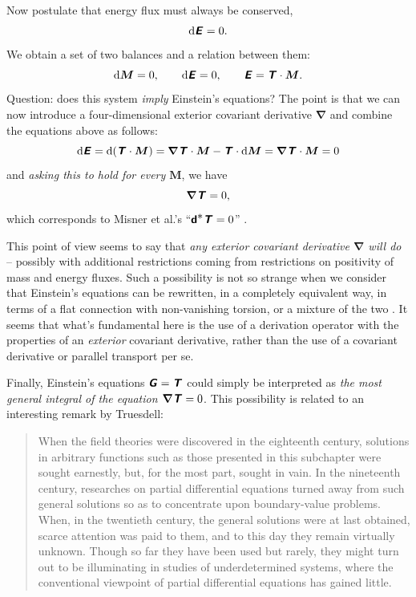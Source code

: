 \documentclass[\ifafour a4paper,12pt,\else a5paper,10pt,\fi%
onecolumn,oneside,article,%
british%
]{memoir}
\theoremstyle{remark}
\theoremstyle{innote}
\newcommand*{\mathte}[1]{\textbf{\textit{\textsf{#1}}}}
\newcommand*{\citep}{\parencites}
\newcommand*{\di}{\mathrm{d}}%
\renewcommand*{\|}{\nonscript\,\vert\nonscript\;\mathopen{}}
\newcommand*{\chap}{ch.}%
\newcommand*{\etal}{{et al.}}
\newcommand*{\yrr}{M}
\newcommand*{\yr}{\bm{\yrr}}
\newcommand*{\yEE}{E}
\newcommand*{\yE}{\mathte{\yEE}}
\newcommand*{\yEii}{G}
\newcommand*{\yEi}{\mathte{\yEii}}
\newcommand*{\yTTf}{T}
\newcommand*{\yTf}{\mathte{\yTTf}}
\newcommand*{\yDi}{\bm{\nabla}}
\begin{document}
Now postulate that energy flux must always be conserved,
\begin{equation}
  \label{eq:conserv_energy-momentum_try}
  \di\yE = 0.
\end{equation}
We obtain a set of two balances and a relation between them:
\begin{equation}
  \label{eq:massb_energyb_relation}
  \di\yr = 0, \qquad \di\yE = 0, \qquad \yE = \yTf \cdot \yr.
\end{equation}
Question: does this system \emph{imply} Einstein's equations? The point
is that we can now introduce a four-dimensional exterior covariant
derivative $\yDi$ and combine the  equations above as follows:
\begin{equation}
  \label{eq:why_4stress_zero}
     \di\yE
    = \di(\yTf \cdot \yr) 
    = \yDi\yTf \cdot \yr - \yTf \cdot \di\yr
   = \yDi\yTf \cdot \yr
    = 0
\end{equation}
and \emph{asking this to hold for every $\yr$}, we have
\begin{equation}
  \label{eq:div_T_vanishes}
  \yDi\yTf = 0,
\end{equation}
which corresponds to Misner \etal's
\enquote{$\bm{\mathsf{d}}{}^{\displaystyle *}\yTf=0$}
\citep[\chap~15]{misneretal1970_r2003}.

This point of view seems to say that \emph{any exterior covariant
  derivative $\yDi$ will do} -- possibly with additional restrictions
coming from restrictions on positivity of mass and energy fluxes. Such a
possibility is not so strange when we consider that Einstein's equations
can be rewritten, in a completely equivalent way, in terms of a flat
connection with non-vanishing torsion, or a mixture of the two
\citep{deandradeetal2000,arcosetal2004,aldrovandietal2013,pereira2014,caietal2016}.
It seems that what's fundamental here is the use of a derivation operator
with the properties of an \emph{exterior} covariant derivative, rather than
the use of a covariant derivative or parallel transport per se.

Finally, Einstein's equations $\yEi = \yTf$ could simply be interpreted as
\emph{the most general integral of the equation $\yDi\yTf = 0$}. This
possibility is related to an interesting remark by Truesdell:
\begin{quote}
  When the field theories were discovered in the eighteenth century, solutions
in arbitrary functions such as those presented in this subchapter were sought
earnestly, but, for the most part, sought in vain. In the nineteenth century,
researches on partial differential equations turned away from such general
solutions so as to concentrate upon boundary-value problems. When, in the
twentieth century, the general solutions were at last obtained, scarce attention
was paid to them, and to this day they remain virtually unknown. Though
so far they have been used but rarely, they might turn out to be illuminating
in studies of underdetermined systems, where the conventional viewpoint of
partial differential equations has gained little.  \citep[p.~594]{truesdelletal1960}
\end{quote}
\end{document}
